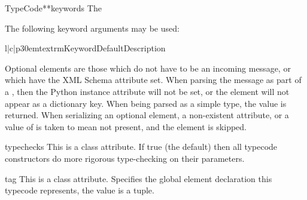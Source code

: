 \begin{classdesc}{TypeCode}{**keywords}
The  

The following keyword arguments may be used:

\begin{tableiii}{l|c|p{30em}}{textrm}{Keyword}{Default}{Description}


\end{tableiii}

Optional elements are those which do not have to be an incoming
message, or which have the XML Schema  attribute set.
When parsing the message as part of a , then the Python
instance attribute will not be set, or the element will not appear as
a dictionary key.
When being parsed as a simple type, the value  is returned.
When serializing an optional element, a non-existent attribute, or a value
of  is taken to mean not present, and the element is skipped.

\end{classdesc}

\begin{memberdesc}{typechecks}
This is a class attribute.
If true (the default) then all typecode constructors do more
rigorous type-checking on their parameters.
\end{memberdesc}

\begin{memberdesc}{tag}
This is a class attribute.
Specifies the global element declaration this typecode represents, the value is
a  tuple.
\end{memberdesc}

